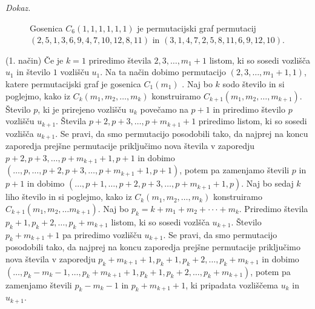 \documentclass[a4paper, 12pt]{book}
\newenvironment{dokaz}{\emph{Dokaz.}\ }{\hspace{\fill}{$\Box$}}
\begin{document}
\begin{dokaz}
\begin{figure}[h]
\begin{center}
        \end{center}
        \caption{ Gosenica $C_6(1, 1, 1, 1, 1, 1)$ je permutacijski graf permutacij $(2, 5, 1, 3, 6, 9, 4, 7, 10, 12, 8, 11)$ in $(3, 1, 4, 7, 2, 5, 8, 11, 6, 9, 12, 10)$.}
        \label{gosenica_dve_permutaciji2}
    \end{figure}

    (1. način) Če je $k = 1$ priredimo števila $2, 3,\dots, m_1+1$ listom, ki so sosedi vozlišča $u_1$ in  število $1$ vozlišču $u_1$. Na ta način dobimo permutacijo $(2, 3,\dots, m_1+1, 1)$, katere permutacijski graf je gosenica $C_1(m_1)$ . Naj bo $k$ sodo število in si poglejmo, kako iz $C_k(m_1, m_2, \dots, m_k)$ konstruiramo $C_{k+1}(m_1, m_2, \dots, m_{k+1})$. Število $p$, ki je prirejeno vozlišču $u_k$ povečamo na $p+1$ in priredimo število $p$ vozlišču $u_{k+1}$. Števila $p+2, p+3, \dots, p+m_{k+1}+1$ priredimo listom, ki so sosedi vozlišča $u_{k+1}$. Se pravi, da smo permutacijo posodobili tako, da najprej na koncu zaporedja prejšne permutacije priključimo nova števila v zaporedju $p+2, p+3, \dots, p+m_{k+1}+1, p+1$ in dobimo $(\dots, p, \dots, p+2, p+3, \dots, p+m_{k+1}+1, p+1)$, potem pa zamenjamo števili $p$ in $p+1$ in dobimo $(\dots, p+1, \dots, p+2, p+3, \dots, p+m_{k+1}+1, p)$. Naj bo sedaj $k$ liho število in si poglejmo, kako iz $C_k(m_1, m_2, \dots, m_k)$ konstruiramo $C_{k+1}(m_1, m_2, \dots m_{k+1})$. Naj bo $p_k = k + m_1 + m_2 + \cdot\cdot\cdot + m_k$. Priredimo števila $p_k+1, p_k+2, \dots, p_k+m_{k+1}$ listom, ki so sosedi vozlšča $u_{k+1}$. Število $p_k+m_{k+1}+1$ pa priredimo vozlišču $u_{k+1}$. Se pravi, da smo permutacijo posodobili tako, da najprej na koncu zaporedja prejšne permutacije priključimo nova števila v zaporedju $p_k + m_{k+1} + 1, p_k+1, p_k+2, \dots,p_k+m_{k+1}$ in dobimo $(\dots, p_k - m_k - 1, \dots, p_k + m_{k+1} + 1, p_k+1, p_k+2,\dots,p_k+m_{k+1})$, potem pa zamenjamo števili $p_k - m_k - 1$ in $p_k + m_{k+1} + 1$, ki pripadata vozliščema $u_k$ in $u_{k+1}$. 


\end{dokaz}
\end{document}
